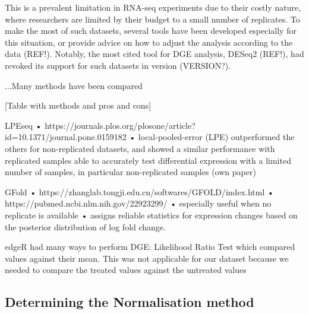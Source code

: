 This is a prevalent limitation in RNA-seq experiments due to their costly nature, where researchers are limited by their budget to a small number of replicates. To make the most of such datasets, several tools have been developed especially for this situation, or provide advice on how to adjust the analysis according to the data (REF!). Notably, the most cited tool for \ac{DGE} analysis, DESeq2 (REF!), had revoked its support for such datasets in version (VERSION?).

...Many methods have been compared

[Table with methods and pros and cons]


LPEseq
•	https://journals.plos.org/plosone/article?id=10.1371/journal.pone.0159182
•	local-pooled-error (LPE)
 outperformed the others for non-replicated datasets, and showed a similar performance with replicated samples
able to accurately test differential expression with a limited number of samples, in particular non-replicated samples (own paper)


GFold
•	https://zhanglab.tongji.edu.cn/softwares/GFOLD/index.html
•	https://pubmed.ncbi.nlm.nih.gov/22923299/
•	especially useful when no replicate is available
•	assigns reliable statistics for expression changes based on the posterior distribution of log fold change.

edgeR had many ways to perform DGE:
Likelihood Ratio Test which compared values against their mean. This was not applicable for our dataset because we needed to compare the treated values against the untreated values


% 

\subsection{Determining the Normalisation method}

